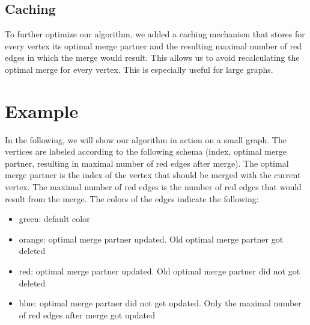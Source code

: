 \documentclass[10pt]{article}
\begin{document}
\subsection{Caching}
To further optimize our algorithm, we added a caching mechanism that stores for every
vertex its optimal merge partner and the resulting maximal number of red edges in which
the merge would result. This allows us to avoid recalculating the optimal merge for every
vertex. This is especially useful for large graphs.

\section{Example}
In the following, we will show our algorithm in action on a small graph. The vertices are
labeled according to the following schema (index, optimal merge partner, resulting in maximal number of red edges after merge). The optimal merge partner is the index of the
vertex that should be merged with the current vertex. The maximal number of red edges is
the number of red edges that would result from the merge. The colors of the edges
indicate the following:
\begin{itemize}
    \item green: default color
    \item orange: optimal merge partner updated. Old optimal merge partner got deleted
    \item red: optimal merge partner updated. Old optimal merge partner did not got deleted
    \item blue: optimal merge partner did not get updated. Only the maximal number of red edges
          after merge got updated
\end{itemize}

\end{document}
